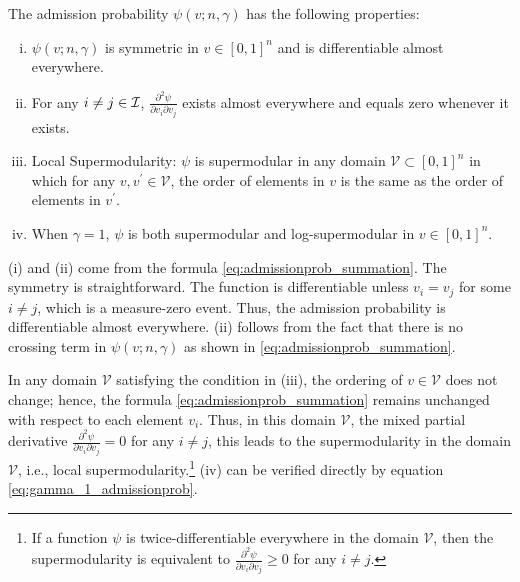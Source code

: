 \begin{proposition}
\label{prop:admissionprob_property}
 The admission probability $\psi(v;n,\gamma)$ has the following properties:
 \begin{enumerate}[(i)]
    \item $\psi(v;n,\gamma)$ is symmetric in $v\in [0,1]^n$ and is differentiable almost everywhere.
  
 
     \item For any $i\neq j\in \mathcal{I}$, $\frac{\partial^2  \psi}{\partial v_i\partial v_j}$ exists almost everywhere and equals zero whenever it exists.
    
     \item Local Supermodularity: $\psi$ is supermodular in any domain $\mathcal{V}\subset 
     [0,1]^n$ in which for any $v,v^\prime \in \mathcal{V}$, the order of elements in $v$ is the same as the order of elements in $v^\prime$.


     \item When $\gamma=1$, $\psi$ is both supermodular and log-supermodular in $v\in [0,1]^n$.

 
 \end{enumerate}
\end{proposition}



 (i) and (ii) come from the formula \eqref{eq:admissionprob_summation}. The symmetry is straightforward. The function is differentiable unless $v_i=v_j$ for some $i\neq j$, which is a measure-zero event. Thus, the admission probability is differentiable almost everywhere.  (ii) follows from the fact that there is no crossing term in $\psi(v;n,\gamma)$ as shown in \eqref{eq:admissionprob_summation}.

In any domain $\mathcal{V}$ satisfying the condition in  (iii), the ordering of $v\in \mathcal{V}$ does not change; hence, the formula \eqref{eq:admissionprob_summation} remains unchanged with respect to each element $v_i$. Thus, in this domain $\mathcal{V}$, the mixed partial derivative $\frac{\partial^2 \psi}{\partial v_i\partial v_j}=0$ for any $i\neq j$,
this leads to the supermodularity in the domain $\mathcal{V}$, i.e.,  local supermodularity.\footnote{If a function $\psi$ is twice-differentiable everywhere in the domain $\mathcal{V}$, then the supermodularity is equivalent to $\frac{\partial^2 \psi}{\partial v_i\partial v_j}\geq 0$ for any $i\neq j$.}
 (iv) can be verified directly by equation \eqref{eq:gamma_1_admissionprob}.



